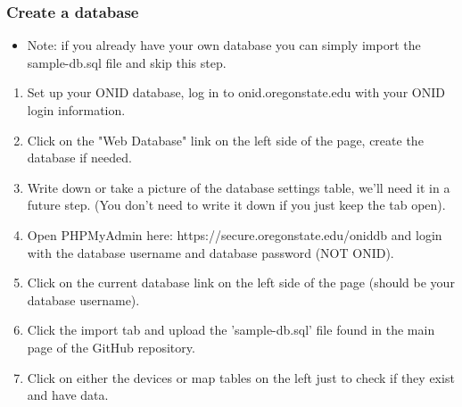 \documentclass[onecolumn, draftclsnofoot,10pt, compsoc]{IEEEtran}
\begin{document}
\subsubsection{Create a database}
    \begin{itemize}
        \item Note: if you already have your own database you can simply import the sample-db.sql file and skip this step.
    \end{itemize} 
\begin{enumerate}
    \item Set up your ONID database, log in to onid.oregonstate.edu with your ONID login information. 
    \item Click on the "Web Database" link on the left side of the page, create the database if needed. 
    \item Write down or take a picture of the database settings table, we'll need it in a future step. (You don't need to write it down if you just keep the tab open). 
    \item Open PHPMyAdmin here: https://secure.oregonstate.edu/oniddb and login with the database username and database password (NOT ONID). 
    \item Click on the current database link on the left side of the page (should be your database username). 
    \item Click the import tab and upload the 'sample-db.sql' file found in the main page of the GitHub repository. 
    \item Click on either the devices or map tables on the left just to check if they exist and have data.
\end{enumerate}
\end{document}
